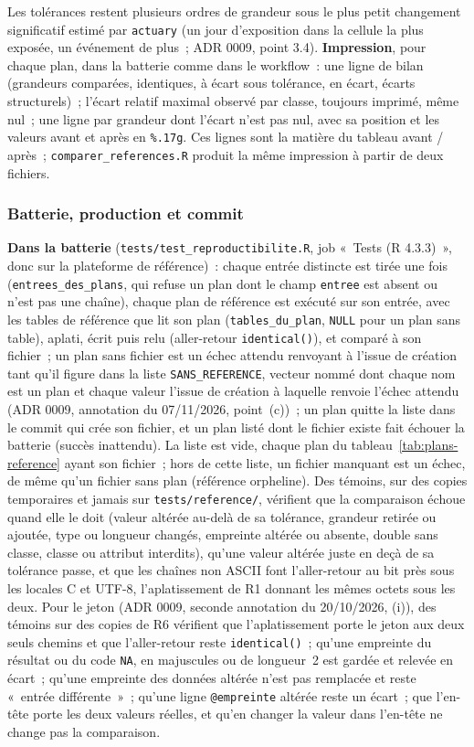 \documentclass[a4paper,11pt]{article}
\newcommand{\code}[1]{\texttt{\small #1}}
\begin{document}
\noindent
Les tolérances restent plusieurs ordres de grandeur sous le plus petit
changement significatif estimé par \code{actuary} (un jour d'exposition dans
la cellule la plus exposée, un événement de plus~; ADR 0009, point 3.4).
\textbf{Impression}, pour chaque plan, dans la batterie comme dans le
workflow~: une ligne de bilan (grandeurs comparées, identiques, à écart sous
tolérance, en écart, écarts structurels)~; l'écart relatif maximal observé
par classe, toujours imprimé, même nul~; une ligne par grandeur dont l'écart
n'est pas nul, avec sa position et les valeurs avant et après en
\code{\%.17g}. Ces lignes sont la matière du tableau avant / après~;
\code{comparer\_references.R} produit la même impression à partir de deux
fichiers.

\subsubsection*{Batterie, production et commit}

\textbf{Dans la batterie} (\code{tests/test\_reproductibilite.R}, job «~Tests
(R 4.3.3)~», donc sur la plateforme de référence)~: chaque entrée distincte
est tirée une fois (\code{entrees\_des\_plans}, qui refuse un plan dont le
champ \code{entree} est absent ou n'est pas une chaîne), chaque plan de
référence est exécuté sur son entrée, avec les tables de référence que lit
son plan (\code{tables\_du\_plan}, \code{NULL} pour un plan sans table),
aplati, écrit puis relu
(aller-retour \code{identical()}), et comparé à son fichier~; un plan sans
fichier est un échec attendu renvoyant à l'issue de création tant qu'il
figure dans la liste \code{SANS\_REFERENCE}, vecteur nommé dont chaque nom
est un plan et chaque valeur l'issue de création à laquelle renvoie l'échec
attendu (ADR 0009, annotation du 07/11/2026, point~(c))~; un plan quitte la
liste dans le commit qui crée son fichier, et un plan listé dont le fichier
existe fait échouer la batterie (succès inattendu). La liste est vide,
chaque plan du tableau~\ref{tab:plans-reference} ayant son fichier~; hors
de cette liste, un fichier manquant est un échec, de
même qu'un fichier sans plan (référence orpheline). Des témoins, sur des
copies temporaires et jamais sur \code{tests/reference/}, vérifient que la
comparaison échoue quand elle le doit (valeur altérée au-delà de sa
tolérance, grandeur retirée ou ajoutée, type ou longueur changés, empreinte
altérée ou absente, double sans classe, classe ou attribut interdits), qu'une
valeur altérée juste en deçà de sa tolérance passe, et que les chaînes non
ASCII font
l'aller-retour au bit près sous les locales C et UTF-8, l'aplatissement de R1
donnant les mêmes octets sous les deux. Pour le jeton (ADR 0009, seconde
annotation du 20/10/2026, (i)), des témoins sur des copies de R6 vérifient
que l'aplatissement porte le jeton aux deux seuls chemins et que
l'aller-retour reste \code{identical()}~; qu'une empreinte du résultat ou du
code \code{NA}, en majuscules ou de longueur~2 est gardée et relevée en
écart~; qu'une empreinte des données altérée n'est pas remplacée et reste
«~entrée différente~»~; qu'une ligne \code{@empreinte} altérée reste un
écart~; que l'en-tête porte les deux valeurs réelles, et qu'en changer la
valeur dans l'en-tête ne change pas la comparaison.
\end{document}
